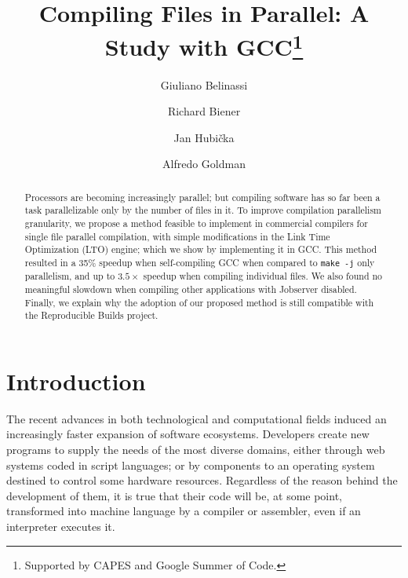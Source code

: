 \documentclass[runningheads]{llncs}
\begin{document}


%
\title{Compiling Files in Parallel: A Study with GCC\thanks{Supported by CAPES and Google Summer of Code.}}
%
%
\author{Giuliano Belinassi \and Richard Biener \and Jan Hubi\v cka  \and Alfredo Goldman}
%
%

%
\maketitle              %
%
\begin{abstract}

Processors are becoming increasingly parallel; but compiling software has so
far been a task parallelizable only by the number of files in it. To improve
compilation parallelism granularity, we propose a method feasible to implement
in commercial compilers for single file parallel compilation, with simple
modifications in the Link Time Optimization (LTO) engine; which we show by
implementing it in GCC. This method resulted in a 35\% speedup when
self-compiling GCC when compared to \texttt{make -j} only parallelism, and
up to $3.5\times$ speedup when compiling individual files. We also found no
meaningful slowdown when compiling other applications with Jobserver disabled.
Finally, we explain why the adoption of our proposed method is still compatible
with the Reproducible Builds project.

\end{abstract}
%
%
%
\section{Introduction}

The recent advances in both technological and computational fields induced an
increasingly faster expansion of software ecosystems. Developers create new
programs to supply the needs of the most diverse domains, either through web
systems coded in script languages; or by components to an operating system
destined to control some hardware resources. Regardless of the reason behind
the development of them, it is true that their code will be, at some
point, transformed into machine language by a compiler or assembler, even if an
interpreter executes it.
\end{document}
